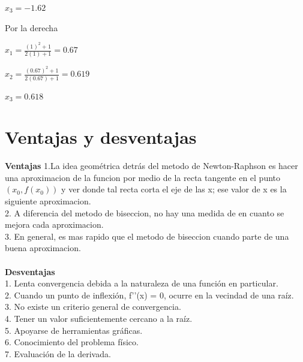 \documentclass{article}
\begin{document}
\begin{multicols}{2}
\begin{center}
$x_{3}=-1.62$
\end{center}
Por la derecha
\begin{center}
$x_{1}=\frac{(1)^{2}+1}{2(1)+1} = 0.67$
\end{center}

\begin{center}
$x_{2}=\frac{(0.67)^{2}+1}{2(0.67)+1} = 0.619$
\end{center}

\begin{center}
$x_{3}= 0.618$
\end{center}
\section{Ventajas y desventajas}
\textbf{Ventajas}
1.La idea geométrica detrás del metodo de Newton-Raphson es
hacer una aproximacion de la funcion por medio de la recta
tangente en el punto $(x_{0}, f (x_{0}))$ y ver donde tal recta corta el eje de las x; ese valor de x es la siguiente aproximacion.
\\
2. A diferencia del metodo de biseccion, no hay una medida de
en cuanto se mejora cada aproximacion.
\\
3. En general, es mas rapido que el metodo de biseccion cuando
parte de una buena aproximacion.
\\
\\
\textbf{Desventajas}
\\
1. Lenta convergencia debida a la naturaleza de una función en particular. 
\\
2. Cuando un punto de inflexión, f’’(x) = 0, ocurre en la vecindad de una raíz.
 \\ 
3. No existe un criterio general de convergencia. 
\\
4. Tener un valor suficientemente cercano a la raíz. 
\\
5. Apoyarse de herramientas gráficas. 
\\
6. Conocimiento del problema físico. 
\\
7. Evaluación de la derivada.


\end{multicols}
\end{document}
